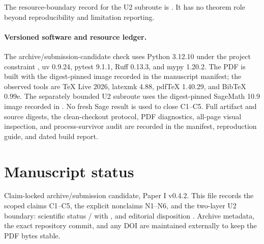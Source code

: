 \documentclass[11pt]{article}
\theoremstyle{definition}
\theoremstyle{remark}
\begin{document}
The resource-boundary record for the U2 subroute is
.
It has no theorem role beyond reproducibility and limitation reporting.

\paragraph{Versioned software and resource ledger.}
The archive/submission-candidate check uses Python 3.12.10 under the project constraint
, uv 0.9.24, pytest 9.1.1, Ruff 0.13.3, and mypy 1.20.2.
The PDF is built with the digest-pinned
 image recorded in the manuscript
manifest; the observed tools are TeX Live 2026, latexmk 4.88, pdfTeX 1.40.29,
and BibTeX 0.99e.  The separately bounded U2 subroute uses the digest-pinned
SageMath 10.9 image recorded in .  No fresh Sage result is
used to close C1--C5.  Full artifact and source digests, the clean-checkout
protocol, PDF diagnostics, all-page visual inspection, and process-survivor
audit are recorded in the manifest, reproduction guide, and dated build
report.

\section*{Manuscript status}

Claim-locked archive/submission candidate, Paper I v0.4.2.  This file records
the scoped claims C1--C5, the explicit nonclaims N1--N6, and the two-layer U2
boundary: scientific status
/
 with
, and editorial disposition
.  Archive
metadata, the exact repository commit, and any DOI are maintained externally
to keep the PDF bytes stable.



\end{document}

